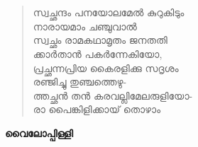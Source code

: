 \chapter*{}
\thispagestyle{empty}
\begin{verse}
സ്വച്ഛന്ദം പനയോലമേല്‍ കുറുകിടും\\
നാരായമാം ചഞ്ചുവാല്‍\\
സ്വച്ഛം രാമകഥാമൃതം ജനതതി\\
ക്കാര്‍താന്‍ പകര്‍ന്നേകിയോ,\\
പ്രച്ഛന്നപ്രിയ കൈരളിക്കു സദൃശം\\
രഞ്ജിച്ചു തുഞ്ചത്തെഴു-\\
ത്തച്ഛന്‍ തന്‍ കരവല്ലിമേലരുളിയോ-\\
രാ പൈങ്കിളിക്കായ് തൊഴാം
\end{verse}

\begin{flushright}
\textbf{വൈലോപ്പിള്ളി}
\end{flushright}


